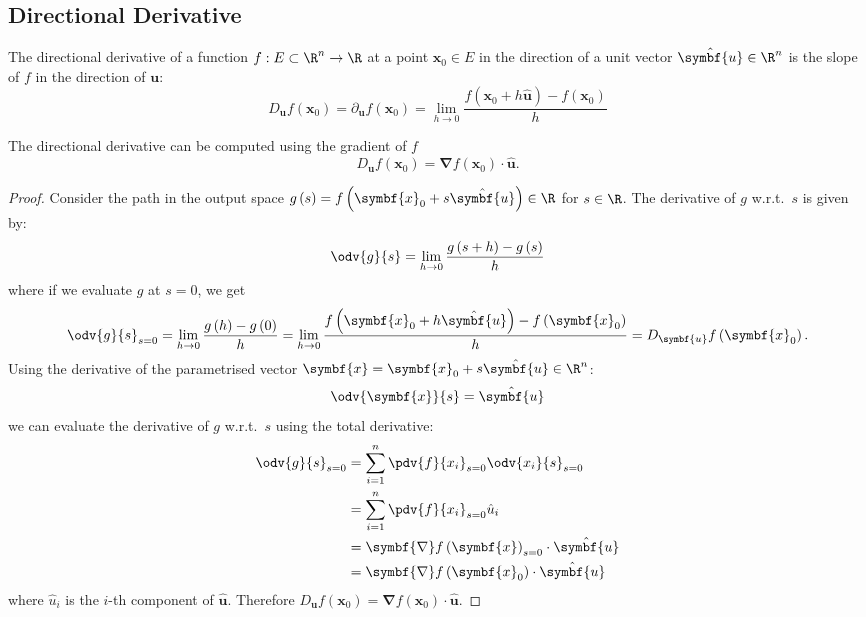 \documentclass{article}
\begin{document}
\subsection{Directional Derivative}
The directional derivative of a function \(f : E \subset \R^n \to \R\)
at a point \(\symbf{x}_0 \in E\) in the direction of a unit vector
\(\hat{\symbf{u}} \in \R^n\) is the slope of \(f\) in the direction of
\(\symbf{u}\):
\begin{equation*}
    D_{\symbf{u}} f\left( \symbf{x}_0 \right) = \partial_{\symbf{u}} f\left( \symbf{x}_0 \right) = \lim_{h \to 0}
     \frac{f\left( \symbf{x}_0 + h \hat{\symbf{u}} \right) - f\left(
     \symbf{x}_0 \right)}{h}
\end{equation*}
\begin{proposition}
    The directional derivative can be computed using the gradient of \(f\)
    \begin{equation*}
        D_{\symbf{u}} f\left( \symbf{x}_0 \right) = \symbf{\nabla} f\left( \symbf{x}_0 \right) \cdot \hat{\symbf{u}}.
    \end{equation*}
\end{proposition}
\begin{proof}
    Consider the path in the output space \(g\left( s \right) = f\left( \symbf{x}_0 + s \hat{\symbf{u}} \right) \in \R\) for \(s \in \R\).
    The derivative of \(g\) w.r.t.\ \(s\) is given by:
    \begin{equation*}
        \odv{g}{s} = \lim_{h \to 0} \frac{g\left( s + h \right) - g\left( s \right)}{h}
    \end{equation*}
    where if we evaluate \(g\) at \(s = 0\), we get
    \begin{equation*}
        \odv{g}{s}_{s = 0} = \lim_{h \to 0} \frac{g\left( h \right) - g\left( 0 \right)}{h} = \lim_{h \to 0} \frac{f\left( \symbf{x}_0 + h \hat{\symbf{u}} \right) - f\left( \symbf{x}_0 \right)}{h} = D_{\symbf{u}} f\left( \symbf{x}_0 \right).
    \end{equation*}
    Using the derivative of the parametrised vector \(\symbf{x} = \symbf{x}_0 + s \hat{\symbf{u}} \in \R^n\):
    \begin{equation*}
        \odv{\symbf{x}}{s} = \hat{\symbf{u}}
    \end{equation*}
    we can evaluate the derivative of \(g\) w.r.t.\ \(s\) using the total derivative:
    \begin{align*}
        \odv{g}{s}_{s = 0} & = \sum_{i = 1}^n \pdv{f}{x_i}_{s = 0} \odv{x_i}{s}_{s = 0}               \\
                           & = \sum_{i = 1}^n \pdv{f}{x_i}_{s = 0} \hat{u}_i                          \\
                           & = \symbf{\nabla} f\left( \symbf{x} \right)_{s = 0} \cdot \hat{\symbf{u}} \\
                           & = \symbf{\nabla} f\left( \symbf{x}_0 \right) \cdot \hat{\symbf{u}}
    \end{align*}
    where \(\hat{u}_i\) is the \(i\)-th component of \(\hat{\symbf{u}}\).
    Therefore \(D_{\symbf{u}} f\left( \symbf{x}_0 \right) = \symbf{\nabla} f\left( \symbf{x}_0 \right) \cdot \hat{\symbf{u}}\).
\end{proof}
\end{document}
